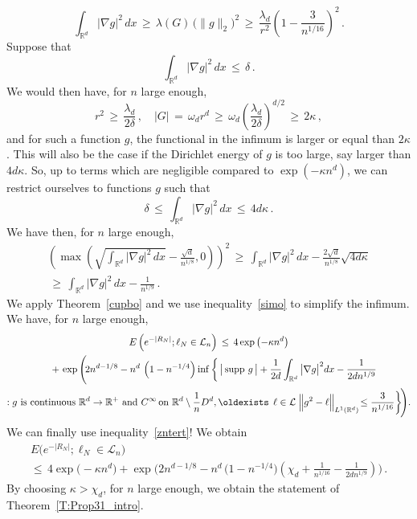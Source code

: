 \documentclass[10pt]{amsart}
\theoremstyle{definition}\newtheorem{defi}[theo]{Definition}\newtheorem{rema}[theo]{Remark}\newtheorem{exam}[theo]{Example}\newtheorem{exem}[theo]{Example}\newtheorem{nota}[theo]{Notation}
\newcommand*\supp{\text{supp\,}}
\newcommand*\Rd {{\mathbb R^d}}
\newcommand*\R{\mathbb{R}}
\newcommand{\cL}{\mathcal{L}}
\renewcommand*{\exists}{\mathrel{\oldexists}}
\begin{document}
\[
\int_{\Rd}\big|\nabla g\big|^2\,dx\,\geq\,
\lambda(G)\,\big(\|g\|_2\big)^2\,\geq\,
\frac{\lambda_d}{r^{2}}
\left(1-\frac{3}{n^{1/16}}\right)^2
\,.
\]
Suppose that
\[
\int_{\Rd}\big|\nabla g\big|^2\,dx\,\leq\,\delta\,.
\]
We would then have, for $n$ large enough,
\[
r^2\,\geq\,
\frac{\lambda_d}{{2}\delta}\,,\quad |G|\,=\,
\omega_dr^d\,\geq\,
\omega_d
\left(\frac{\lambda_d}{{2}\delta}\right)^{d/2}\,\geq\,2\kappa
\,,
\]
and for such a function $g$, the functional in the infimum is larger or equal than $2\kappa$. This will also be the case if the Dirichlet energy of $g$ is too large, say larger than $4d\kappa$. So, up to terms which are negligible compared to $\exp(-\kappa n^d)$, we can restrict ourselves to functions $g$ such that
\[
\delta\,\leq\,\int_{\Rd}\big|\nabla g\big|^2\,dx\,\leq\,4d\kappa\,.
\]
We have then, for $n$ large enough,
\begin{multline}\label{simo}
\left(\max\left(
\sqrt{
\int_{\Rd}\big|\nabla g\big|^2\,dx }-
\frac{\sqrt{d}}{n^{1/8}},0\right) \right)^2
\,\geq\,
\int_{\Rd}\big|\nabla g\big|^2\,dx-
\frac{2\sqrt{d}}{n^{1/8}}\sqrt{4d\kappa}\\
\,\geq\,
\int_{\Rd}\big|\nabla g\big|^2\,dx-
\frac{1}{n^{1/9}}
\,.
\end{multline}
We apply Theorem~\ref{cupbo} and we use inequality~\eqref{simo} to simplify the infimum. We have, for $n$ large enough,
\begin{multline*}
E\left(e^{-|R_N|};
\ell_N\in\cL_n\right)\,\leq\, 4\exp\left(-\kappa n^d\right)
\\
\mkern20mu+\,\exp\Bigg(\!2n^{d-1/8}- n^d\, \left(1-n^{-1/4}\right)
\inf\bigg\{\,
\big|\,\supp\,g\,\big| +
\frac{1} {2d}
\int_{\Rd}\big|\nabla g\big|^2 dx-
\frac{1}{2dn^{1/9}}
\\
: g\text{ is continuous } \Rd\to\R^+
\text{ and }C^\infty\!\text{ on }\Rd\setminus \frac{1}{n}D^d,
\exists\,\ell\in\cL\;
\Big\|g^2- \ell\Big\|_{L^1(\Rd)}
\!\leq
\frac{3}{n^{1/16}}\!
\,\bigg\}\!\Bigg).
\end{multline*}
We can finally use inequality~\eqref{zntert}! We obtain
\begin{multline*}
E\big(e^{-|R_N|};
\ell_N\in\cL_n\big)\\
\leq\, 4\exp\big(-\kappa n^d\big)+
\exp\Bigg(2n^{d-1/8}- n^d\, \big(1-n^{-1/4}\big)
\left(
\chi_d+ \frac{1}{n^{1/16}} -\frac{1}{2dn^{1/9}}
\right)\Bigg)\,.
\end{multline*}
By choosing $\kappa> \chi_d$, for $n$ large enough, we obtain the statement of Theorem~\ref{T:Prop31_intro}.
\end{document}
